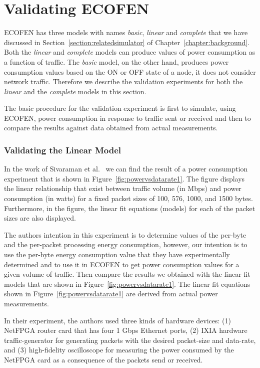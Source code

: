 \section{Validating ECOFEN}
ECOFEN has three models with names \emph{basic}, \emph{linear} and \emph{complete} that we have discussed in Section~\ref{section:relatedsimulator} of Chapter~\ref{chapter:background}. Both the \emph{linear} and \emph{complete} models can produce values of power consumption as a function of traffic. The  \emph{basic} model, on the other hand, produces power consumption values based on the ON or OFF state of a node, it does not consider network traffic. Therefore we describe the validation experiments for both the \emph{linear} and the \emph{complete} models in this section. 
 
The basic procedure for the validation experiment is first to simulate, using ECOFEN, power consumption in response to traffic sent or received and then to compare the results against data obtained from actual measurements.

\subsubsection{Validating the Linear Model}
In the work of Sivaraman et al.~\cite{Sivaraman} we can find the result of a power consumption experiment that is shown in Figure~\ref{fig:powervsdatarate1}. The figure displays the linear relationship that exist between traffic volume (in Mbps) and power consumption (in watts) for a fixed packet sizes of 100, 576, 1000, and 1500 bytes. Furthermore, in the figure, the linear fit equations (models) for each of the packet sizes are also displayed. 

The authors intention in this experiment is to determine values of the per-byte and the per-packet processing energy consumption, however, our intention is to use the per-byte energy consumption value that they have experimentally determined and to use it in ECOFEN to get power consumption values for a given volume of traffic. Then compare the results we obtained with the linear fit models that are shown in Figure~\ref{fig:powervsdatarate1}. The linear fit equations shown in Figure~\ref{fig:powervsdatarate1} are derived from actual power measurements.

In their experiment, the authors used three kinds of hardware devices: (1) NetFPGA router card that has four 1 Gbps Ethernet ports, (2) IXIA hardware traffic-generator for generating packets with the desired packet-size and data-rate, and (3) high-fidelity oscilloscope for measuring the power consumed by the NetFPGA card as a consequence of the packets send or received. 

